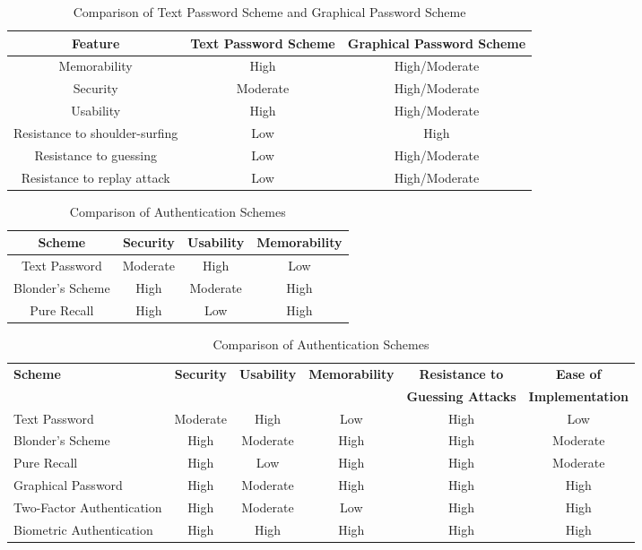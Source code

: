 \begin{table}[ht]
\centering
\caption{Comparison of Text Password Scheme and Graphical Password Scheme}
\begin{tabular}{|c|c|c|}
\hline
\textbf{Feature} & \textbf{Text Password Scheme} & \textbf{Graphical Password Scheme} \\
\hline
Memorability & High & High/Moderate \\
\hline
Security & Moderate & High/Moderate \\
\hline
Usability & High & High/Moderate \\
\hline
Resistance to shoulder-surfing & Low & High \\
\hline
Resistance to guessing & Low & High/Moderate \\
\hline
Resistance to replay attack & Low & High/Moderate \\
\hline

\end{tabular}
\label{tab:comparison1}
\end{table}

\begin{table}[htbp]
\centering
\caption{Comparison of Authentication Schemes}
\begin{tabular}{|c|c|c|c|}
\hline
\textbf{Scheme} & \textbf{Security} & \textbf{Usability} & \textbf{Memorability} \\ \hline
Text Password & Moderate & High & Low \\ \hline
Blonder's Scheme & High & Moderate & High \\ \hline
Pure Recall & High & Low & High \\ \hline
\end{tabular}
\label{tab:comparison2}
\end{table}

\begin{sidewaystable*}[htbp]
\centering
\caption{Comparison of Authentication Schemes}
\label{tab:comparison3}
\noindent
\begin{tabular}{|l|c|c|c|c|c|}
\hline
\textbf{Scheme} & \textbf{Security} & \textbf{Usability} & \textbf{Memorability} & \textbf{Resistance to} & \textbf{Ease of}\\
 & & & & \textbf{Guessing Attacks} & \textbf{Implementation}\\ \hline
Text Password & Moderate & High & Low & High & Low\\ \hline
Blonder's Scheme & High & Moderate & High & High & Moderate\\ \hline
Pure Recall & High & Low & High & High & Moderate\\ \hline
Graphical Password & High & Moderate & High & High & High\\ \hline
Two-Factor Authentication & High & Moderate & Low & High & High\\ \hline
Biometric Authentication & High & High & High & High & High\\ \hline
\end{tabular}
\end{sidewaystable*}
